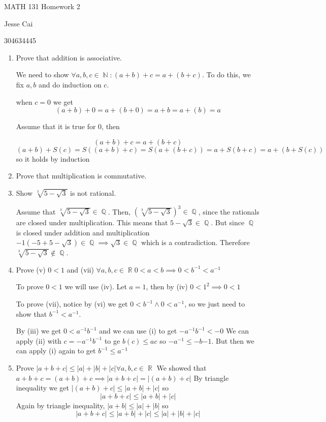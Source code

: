 \documentclass[10pt,a4paper]{article}
\DeclareMathOperator*{\R}{\mathbb{R}}
\DeclareMathOperator*{\Q}{\mathbb{Q}}
\DeclareMathOperator*{\N}{\mathbb{N}}
\begin{document}
MATH 131 Homework 2

Jesse Cai

304634445

\begin{enumerate}
    \item Prove that addition is associative.

    We need to show $\forall a,b,c \in \N:  (a+b)+c = a+(b+c)$. To do this, we fix $a,b$ and do induction on $c$.

    when $c=0$ we get 
    $$ (a+b)+0 = a+(b+0) = a+b = a+(b) = a$$

    Assume that it is true for 0, then 

    $$ (a+b)+c = a+(b+c)$$
    $$ (a+b) + S(c) = S((a+b)+c)  = S(a+(b+c)) = a + S(b+c) = a  + (b + S(c))$$
    so it holds by induction


    \item Prove that multiplication is commutative.
    \item Show $\sqrt[3]{5 - \sqrt3}$ is not rational.

        Assume that $\sqrt[3]{5 - \sqrt3} \in \Q $.  Then, $\left(\sqrt[3]{5 - \sqrt3}\right)^3 \in \Q$, since the rationals are closed under multiplication.
        This means that $5 - \sqrt3 \in \Q$. But since $\Q$ is closed under addition and multiplication $-1(-5 + 5 - \sqrt3) \in \Q \implies \sqrt3 \in \Q$ which is a contradiction. Therefore $\sqrt[3]{5 - \sqrt3} \not \in \Q$.
    \item Prove (v) $0<1$ and (vii) $\forall a,b, c \in \R 0 < a < b \implies 0 < b^{-1} < a^{-1}$
    
        To prove $0<1$ we will use (iv). Let $a = 1$, then by (iv) $0 < 1^2 \implies 0 < 1$

        To prove (vii), notice by (vi) we get $ 0 < b^{-1} \land 0 < a^{-1}$, so we just need to show that $b^{-1} < a^{-1}$. 

        By (iii) we get $ 0 < a^{-1} b^{-1}$ and we can use (i) to get $ -a^{-1}b^{-1} < -0$
        We can apply (ii) with $ c = -a^{-1}b^{-1}$ to ge $b(c) \leq ac $ so 
        $ - a^{-1} \leq -b{-1}$. But then we can apply (i) again to get $b^{-1} \leq a^{-1}$ 

    \item Prove $\lvert a+b+c\rvert \leq \lvert a \rvert+\lvert b \rvert+\lvert c \rvert \forall a, b, c \in \R$
        We showed that $a+b+c = (a+b)+c \implies \lvert a+b+c\rvert = \lvert (a+b)+c\rvert$
        By triangle inequality we get $\lvert(a+b)+c\rvert \leq \lvert a+b\rvert + \lvert c \rvert$ so 
        $$
            \lvert a+b+c\rvert \leq \lvert a+b\rvert + \lvert c \rvert
        $$
        Again by triangle inequality,  $\lvert a+b\rvert \leq \lvert a\rvert + \lvert b \rvert$ so 
        $$
            \lvert a+b+c\rvert \leq \lvert a+b\rvert + \lvert c \rvert \leq \lvert a\rvert + \lvert b\rvert + \lvert c\rvert
        $$


\end{enumerate}
\end{document}
